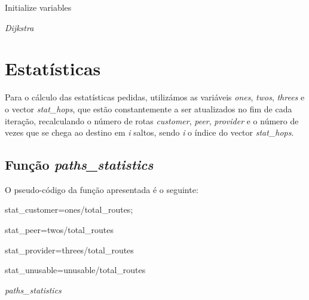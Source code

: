 \documentclass[a4paper]{article}
\begin{document}
\begin{algorithm}[H]
 Initialize variables\;
 
 
 \caption{\textit{Dijkstra}}
\end{algorithm}

\section{Estatísticas}
Para o cálculo das estatísticas pedidas, utilizámos as variáveis \textit{ones}, \textit{twos}, \textit{threes} e o vector \textit{stat\_hops}, que estão constantemente a ser atualizados no fim de cada iteração, recalculando o número de rotas \textit{customer}, \textit{peer}, \textit{provider} e o número de vezes que se chega ao destino em \textit{i} saltos, sendo \textit{i} o índice do vector \textit{stat\_hops}.
\subsection{Função \textit{paths\_statistics}}
O pseudo-código da função apresentada é o seguinte:

\begin{algorithm}[H]
  stat\_customer=ones/total\_routes;
  
  stat\_peer=twos/total\_routes\;
  
  stat\_provider=threes/total\_routes\;
  
  stat\_unusable=unusable/total\_routes\;
 \caption{\textit{paths\_statistics}}
\end{algorithm}
\end{document}
